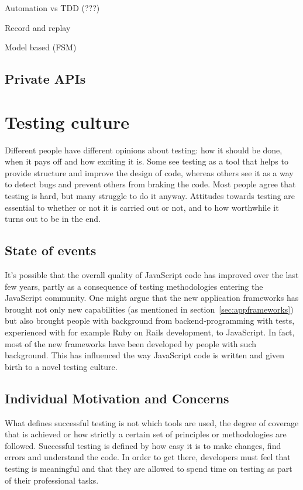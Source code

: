 \documentclass[11pt]{article}
\begin{document}
Automation vs TDD (???)

Record and replay

Model based (FSM)

\subsection{Private APIs}


\section{Testing culture}

Different people have different opinions about testing: how it should be done, when it pays off and how exciting it is. Some see testing as a tool that helps to provide structure and improve the design of code, whereas others see it as a way to detect bugs and prevent others from braking the code. Most people agree that testing is hard, but many struggle to do it anyway. Attitudes towards testing are essential to whether or not it is carried out or not, and to how worthwhile it turns out to be in the end.

\subsection{State of events}

It's possible that the overall quality of JavaScript code has improved over the last few years, partly as a consequence of testing methodologies entering the JavaScript community. One might argue that the new application frameworks has brought not only new capabilities (as mentioned in section~\ref{sec:appframeworks}) but also brought people with background from backend-programming with tests, experienced with for example Ruby on Rails development, to JavaScript. In fact, most of the new frameworks have been developed by people with such background. This has influenced the way JavaScript code is written and given birth to a novel testing culture. \cite[questions~12-15]{Ahnve}

\subsection{Individual Motivation and Concerns}

What defines successful testing is not which tools are used, the degree of coverage that is achieved or how strictly a certain set of principles or methodologies are followed. Successful testing is defined by how easy it is to make changes, find errors and understand the code. In order to get there, developers must feel that testing is meaningful and that they are allowed to spend time on testing as part of their professional tasks.
\end{document}

